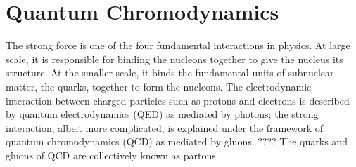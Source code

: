 
\section{Quantum Chromodynamics}\label{section:QCD}%
The strong force is one of the four fundamental interactions in physics. At large scale, it is responsible for binding the nucleons together to give the nucleus its structure. At the smaller scale, it binds the fundamental units of subnuclear matter, the quarks, together to form the nucleons. The electrodynamic interaction between charged particles such as protons and electrons is described by quantum electrodynamics (QED) as mediated by photons; the strong interaction, albeit more complicated, is explained under the framework of quantum chromodynamics (QCD) as mediated by gluons. \cite{KAPUSTA1979461, Shuryak1988} ???? The quarks and gluons of QCD are collectively known as partons.

